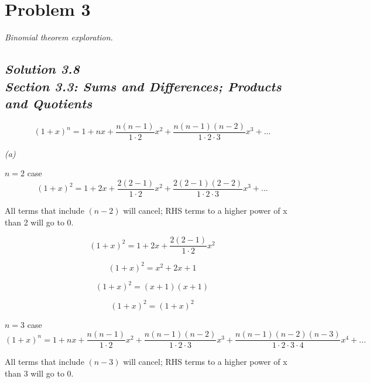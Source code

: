 \documentclass[a4paper, 12pt]{article}
\numberwithin{equation}{section}
\begin{document}
\noindent\makebox[\linewidth]{\rule{\linewidth}{1pt}}
\section{Problem 3}
\emph{Binomial theorem exploration.}
\subsection*{\emph{Solution 3.8\\Section 3.3: Sums and Differences; Products and Quotients}}

\begin{equation}
  ( 1 + x)^n = 1 + nx + \frac{n( n - 1  )} {1 \cdot{ 2}} x^2 + \frac{n( n - 1  ) ( n - 2)} {1 \cdot{2} \cdot{3}} x^3 + ...
\end{equation}

\emph{(a)}

$n=2$
case
\begin{equation}
( 1 + x)^2 = 1 + 2x + \frac{2( 2 - 1  )} {1 \cdot{ 2}} x^2 + \frac{2( 2 - 1  ) ( 2 - 2)} {1 \cdot{2} \cdot{3}} x^3 + ...
\end{equation}

All terms that include $(n-2)$ will cancel; RHS terms to a higher power of x than 2 will go to 0.

\begin{equation}
( 1 + x)^2 = 1 + 2x + \frac{2( 2 - 1  )} {1 \cdot{ 2}} x^2
\end{equation}

\begin{equation}
( 1 + x)^2 = x^2 + 2x + 1
\end{equation}

\begin{equation}
( 1 + x)^2 = (x + 1) (x+1)
\end{equation}

\begin{equation}
\boxed{( 1 + x)^2 = ( 1 + x)^2}
\end{equation}

$n=3$
case
\begin{equation}
    ( 1 + x)^n = 1 + nx + \frac{n( n - 1  )} {1 \cdot{ 2}} x^2 + \frac{n( n - 1  ) ( n - 2)} {1 \cdot{2} \cdot{3}} x^3 +  \frac{n(n-1)(n-2)(n-3)} {1\cdot{2}\cdot{3}\cdot{4}} x^4
    + ...
\end{equation}

All terms that include $(n-3)$ will cancel; RHS terms to a higher power of x than 3 will go to 0.
\end{document}
